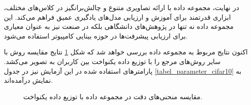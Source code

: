 در نهایت، مجموعه داده
با ارائه تصاویری متنوع و چالش‌برانگیز در کلاس‌های مختلف، ابزاری قدرتمند برای آموزش و ارزیابی مدل‌های یادگیری عمیق فراهم می‌کند. این مجموعه داده نه تنها در پژوهش‌های دانشگاهی بلکه در صنعت نیز به عنوان معیاری برای ارزیابی پیشرفت‌ها در حوزه بینایی کامپیوتر استفاده می‌شود.



اکنون نتایج مربوط به مجموعه داده
بررسی خواهد شد که شکل
\ref{result_cifar10_equal}
نتایج مقایسه روش
با سایر روش‌های مرجع را با توزیع داده یکنواخت بین کاربران به تصویر می‌کشد.
پارامترهای استفاده شده در این آزمایش نیز در جدول
\ref{tabel_parameter_cifar10}
به نمایش درآمده‌اند.


\begin{figure}[t!]
	\centering
	\hspace{0.8mm}
	\caption{
		مقایسه منحنی‌های دقت در مجموعه داده
		با توزیع داده یکنواخت.
	}
	\label{result_cifar10_equal}
\end{figure}



